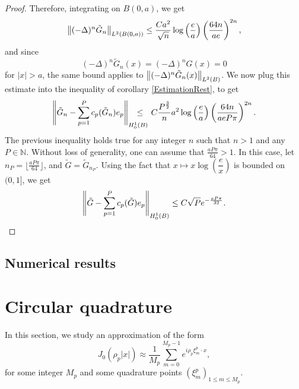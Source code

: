\documentclass[11pt,a4paper]{article}
\begin{document}
\begin{The}
\begin{proof}
		Therefore, integrating on $B(0,a)$, we get
		\[ \left\|(-\Delta)^n \tilde{G}_n\right\|_{L^2(B(0,a))} \leq \dfrac{C a^2}{\sqrt{n}}\log\left(\frac{e}{a}\right)\left( \frac{64n}{ae}\right)^{2n},\]
		and since 
		\[(-\Delta)^n \tilde{G}_n(x) = (-\Delta)^n G(x) = 0\]
		for $|x|>a$, the same bound applies to $\left\|(-\Delta)^n \tilde{G}_n(x)\right\|_{L^2(B)}$. 
		We now plug this estimate into the inequality of corollary \ref{EstimationRest}, to get
		\[ \norm{\tilde{G}_n - \sum_{p=1}^{P}c_p(\tilde{G}_n)e_p}_{H^1_0(B)} \!\!\!\!\!\!\!\!\!\!\leq~~ C \dfrac{P^\frac{3}{2}}{n} a^2 \log\left(\dfrac{e}{a}\right)\left( \frac{64 n}{ae P \pi}\right)^{2n}.\] 
		The previous inequality holds true for any integer $n$ such that $n>1$ and any $P \in \mathbb{N}$. Without loss of generality, one can assume that $\frac{aP\pi}{64} >1$. In this case, let $n_P = \lfloor \frac{aP\pi}{64}\rfloor $, and $\tilde{G} = \tilde{G}_{n_P}$. Using the fact that $x\mapsto x \log\left(\dfrac{e}{x}\right)$ is bounded on $(0,1]$, we get 
		\[ \left\|\tilde{G} - \sum_{p=1}^{P}c_p(\tilde{G})e_p\right\|_{H^1_0(B)} \leq C \sqrt{P} e^{-\frac{aP\pi}{32}}. 	\qedhere\]
	\end{proof}
\end{The}

\subsection{Numerical results}

\section{Circular quadrature}
\label{sec:circular}
In this section, we study an approximation of the form
\[ J_0(\rho_p|x|) \approx \dfrac{1}{M_p}\sum_{m=0}^{M_p-1}e^{i \rho_p \xi^p_m \cdot x}, \]
for some integer $M_p$ and some quadrature points $(\xi_m^p)_{1 \leq m \leq M_p}$. 
\end{document}
